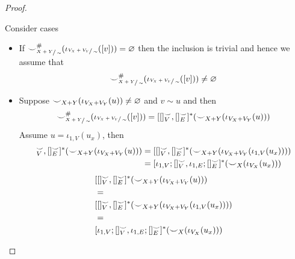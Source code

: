 \begin{proof}
\begin{enumerate}
\[    \]
    Consider cases
    \begin{itemize}
        \item If ${\smile}_{\sfrac{X+Y}{\sim}}^{{\#}}(\iota_{\sfrac{V_{X} + V_{Y}}{\sim}}([v])) = \varnothing$ then the inclusion is trivial and hence we assume that
        \[
            {\smile}_{\sfrac{X+Y}{\sim}}^{{\#}}(\iota_{\sfrac{V_{X} + V_{Y}}{\sim}}([v])) \not = \varnothing
        \]
        \item Suppose ${\smile}_{X+Y}(\iota_{V_{X} + V_{Y}}(u)) \not = \varnothing$ and $v \sim u$ and then
        \[
            {\smile}_{\sfrac{X+Y}{\sim}}^{{\#}}(\iota_{\sfrac{V_{X} + V_{Y}}{\sim}}([v])) = [[]_{V}^{{\smile}},[]_{E}^{{\smile}}]^{*}({\smile}_{X+Y}(\iota_{V_{X}+V_{Y}}(u)))
        \]
        Assume $u = \iota_{1,V}(u_{x})$, then
        \ifdefined \ONECOLUMN
        \begin{align*}
            [[]_{V}^{\consistency},[]_{E}^{\consistency}]^{*}(\consistency_{X+Y}(\iota_{V_{X}+V_{Y}}(u)))
            &=
            [[]_{V}^{\consistency},[]_{E}^{\consistency}]^{*}(\consistency_{X+Y}(\iota_{V_{X}+V_{Y}}(\iota_{1,V}(u_{x}))))\\
            &=
            [\iota_{1,V};[]_{V}^{\consistency},\iota_{1,E};[]_{E}^{\consistency}]^{*}(\consistency_{X}(\iota_{V_{X}}(u_{x})))
        \end{align*}
        \else
        \begin{align*}
            &[[]_{V}^{{\smile}},[]_{E}^{{\smile}}]^{*}({\smile}_{X+Y}(\iota_{V_{X}+V_{Y}}(u)))\\
            &=\\
            &[[]_{V}^{{\smile}},[]_{E}^{{\smile}}]^{*}({\smile}_{X+Y}(\iota_{V_{X}+V_{Y}}(\iota_{1,V}(u_{x}))))\\
            &=\\
            &[\iota_{1,V};[]_{V}^{{\smile}},\iota_{1,E};[]_{E}^{{\smile}}]^{*}({\smile}_{X}(\iota_{V_{X}}(u_{x})))
        \end{align*}
        \fi


\end{itemize}
\end{enumerate}
\end{proof}
